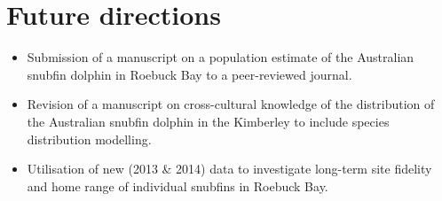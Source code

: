 \documentclass[version=last,
    paper=a4, %
    10pt, %
    usenames,
    dvipsnames,
    oneside, %
    headings=openany, %
    DIV=15 %
]{scrbook}
\begin{document}
\section*{Future directions}

\begin{itemize}
\itemsep1pt\parskip0pt
\item
  Submission of a manuscript on a population estimate of the Australian
  snubfin dolphin in Roebuck Bay to a peer-reviewed journal.
\item
  Revision of a manuscript on cross-cultural knowledge of the
  distribution of the Australian snubfin dolphin in the Kimberley to
  include species distribution modelling.
\item
  Utilisation of new (2013 \& 2014) data to investigate long-term site
  fidelity and home range of individual snubfins in Roebuck Bay.
\end{itemize}



\end{document}
